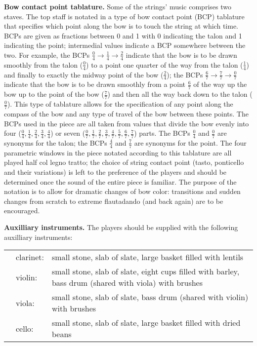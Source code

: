 \documentclass[10pt]{article}
\begin{document}
\begin{textblock}{23}
\textbf{Bow contact point tablature.} Some of the strings' music comprises two
staves. The top staff is notated in a type of bow contact point (BCP) tablature
that specifies which point along the bow is to touch the string at which time.
BCPs are given as fractions between 0 and 1 with 0 indicating the talon and 1
indicating the point; intermedial values indicate a BCP somewhere between the
two. For example, the BCPs $\frac{0}{4} \longrightarrow \frac{1}{4}
\longrightarrow \frac{2}{4}$ indicate that the bow is to be drawn smoothly from
the talon ($\frac{0}{4}$) to a point one quarter of the way from the talon
($\frac{1}{4}$) and finally to exactly the midway point of the bow
($\frac{2}{4}$); the BCPs $\frac{6}{7} \longrightarrow \frac{7}{7}
\longrightarrow \frac{0}{7}$ indicate that the bow is to be drawn smoothly from
a point $\frac{6}{7}$ of the way up the bow up to the point of the bow
($\frac{7}{7}$) and then all the way back down to the talon ($\frac{0}{7}$).
This type of tablature allows for the specification of any point along the
compass of the bow and any type of travel of the bow between these points. The
BCPs used in the piece are all taken from values that divide the bow evenly
into four ($\frac{0}{4}, \frac{1}{4}, \frac{2}{4}, \frac{3}{4}, \frac{4}{4}$)
or seven ($\frac{0}{7}, \frac{1}{7}, \frac{2}{7}, \frac{3}{7}, \frac{4}{7},
\frac{5}{7}, \frac{6}{7}, \frac{7}{7}$) parts. The BCPs $\frac{0}{4}$ and
$\frac{0}{7}$ are synonyms for the talon; the BCPs $\frac{4}{4}$ and
$\frac{7}{7}$ are synonyms for the point. The four parametric windows in the
piece notated according to this tablature are all played half col legno tratto;
the choice of string contact point (tasto, ponticello and their variations) is
left to the preference of the players and should be determined once the sound
of the entire piece is familiar. The purpose of the notation is to allow for
dramatic changes of bow color: transitions and sudden changes from scratch to
extreme flautadando (and back again) are to be encouraged.

\textbf{Auxilliary instruments.} The players should be supplied with the
following auxilliary instruments:

\begin{tabu}{l l l}
\phantom{M} & clarinet: & small stone, slab of slate, large basket filled with lentils \\
            & violin: & small stone, slab of slate, eight cups filled with barley, bass drum (shared with viola) with brushes \\
            & viola: & small stone, slab of slate, bass drum (shared with violin) with brushes \\
            & cello: & small stone, slab of slate, large basket filled with dried beans \\
\end{tabu}


\end{textblock}
\end{document}
